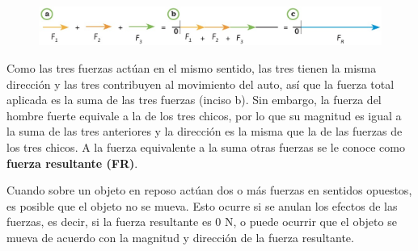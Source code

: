 \documentclass[11pt]{book}
\begin{document}
\begin{figure}[H]
    \centering
    \includegraphics[width=0.9\linewidth]{suma_fuerzas.jpg}
    \label{fig:suma_fuerzas}
\end{figure}


Como las tres fuerzas actúan en el mismo sentido, las tres tienen la misma dirección y
las tres contribuyen al movimiento del auto, así que la fuerza total aplicada es la suma
de las tres fuerzas (inciso b). Sin embargo, la fuerza del hombre fuerte equivale a la de
los tres chicos, por lo que su magnitud es igual a la suma de las tres anteriores y la
dirección es la misma que la de las fuerzas de los tres chicos. A la fuerza equivalente
a la suma otras fuerzas se le conoce como \textbf{fuerza resultante (FR)}.

Cuando sobre un objeto en reposo actúan dos o más fuerzas en sentidos opuestos,
es posible que el objeto no se mueva. Esto ocurre si se anulan los efectos de las
fuerzas, es decir, si la fuerza resultante es 0 N, o puede ocurrir que el objeto
se mueva de acuerdo con la magnitud y dirección de la fuerza resultante.
\end{document}
